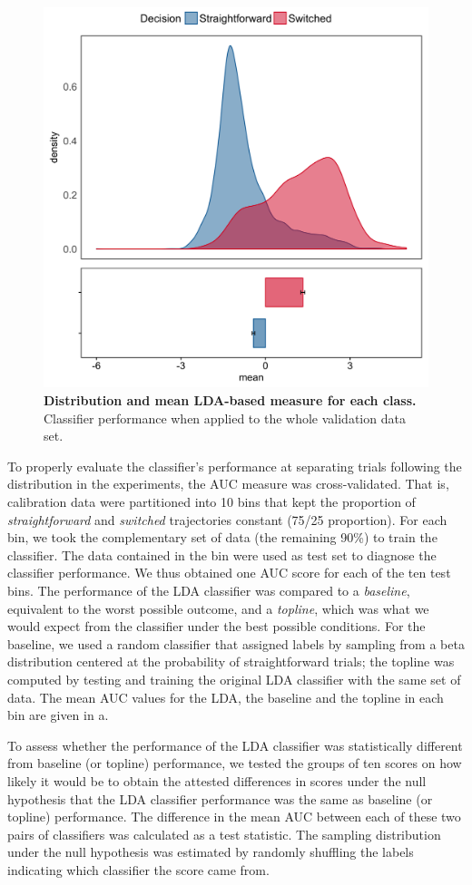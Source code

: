 \documentclass[draft]{article}
\begin{document}
\begin{figure}
\centering
\includegraphics[width=.8\textwidth]{lda_distribution_calibration.png}
\caption{\textbf{Distribution and mean LDA-based measure for each class.} Classifier performance when applied to the whole validation data set.} \label{DIST:LDA}
\end{figure}

To properly evaluate the classifier's performance at separating trials following the distribution in the experiments, the AUC measure was cross-validated. That is, calibration data were partitioned into 10 bins that kept the proportion of \textit{straightforward} and \textit{switched} trajectories constant (75/25 proportion). For each bin, we took the complementary set of data (the remaining 90\%) to train the classifier. The data contained in the bin were used as test set to diagnose the classifier performance. We thus obtained one AUC score for each of the ten test bins. The performance of the LDA classifier was compared to a \emph{baseline}, equivalent to the worst possible outcome, and a \emph{topline}, which was what we would expect from the classifier under the best possible conditions. 
For the baseline, we used a random classifier that assigned labels by sampling from a beta distribution centered at the probability of straightforward trials; the topline was computed by testing and training the original LDA classifier with the same set of data. 
The mean AUC values for the LDA, the baseline and the topline in each bin are given in a. 

To assess whether the performance of the LDA classifier was statistically different from baseline (or topline) performance, we tested the groups of ten scores on how likely it would be to obtain the attested differences in scores under the null hypothesis that the LDA classifier performance was the same as  baseline (or topline) performance.   
The difference in the mean AUC between each of these two pairs of classifiers was calculated as a test statistic. The sampling distribution under the null hypothesis was estimated by randomly shuffling the labels indicating which classifier the score came from.
\end{document}
